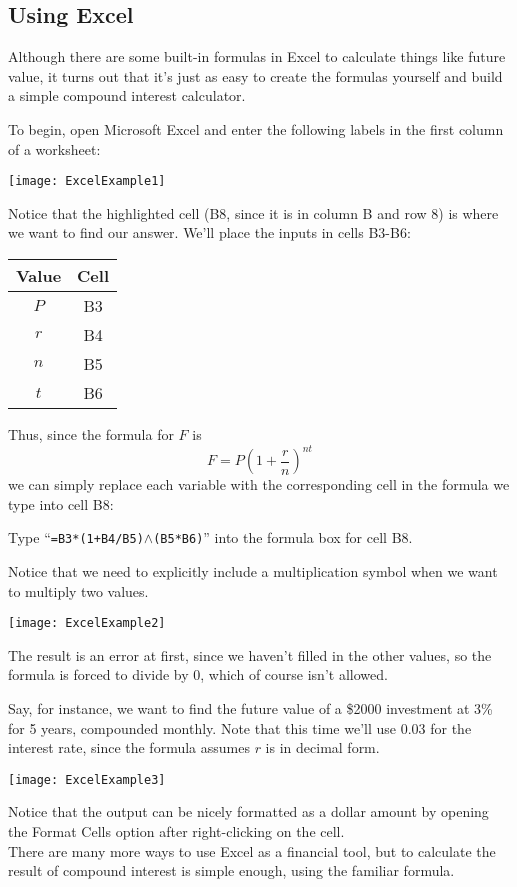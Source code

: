 \subsection{Using Excel}
Although there are some built-in formulas in Excel to calculate things like future value, it turns out that it's just as easy to create the formulas yourself and build a simple compound interest calculator.

To begin, open Microsoft Excel and enter the following labels in the first column of a worksheet:
\begin{center}
\texttt{[image: ExcelExample1]}
\end{center}

Notice that the highlighted cell (B8, since it is in column B and row 8) is where we want to find our answer.  We'll place the inputs in cells B3-B6:
\begin{center}
\begin{tabular}{c c}
\textbf{Value} & \textbf{Cell}\\
\hline
$P$ & B3\\
$r$ & B4\\
$n$ & B5\\
$t$ & B6
\end{tabular}
\end{center}

Thus, since the formula for $F$ is 
\[F = P\left(1+\dfrac{r}{n}\right)^{nt}\]
we can simply replace each variable with the corresponding cell in the formula we type into cell B8:
\begin{center}
Type ``\texttt{=B3*(1+B4/B5)}$\wedge$\texttt{(B5*B6)}'' into the formula box for cell B8.
\end{center}
Notice that we need to explicitly include a multiplication symbol when we want to multiply two values.
\begin{center}
\texttt{[image: ExcelExample2]}
\end{center}

The result is an error at first, since we haven't filled in the other values, so the formula is forced to divide by 0, which of course isn't allowed.
\vfill
\pagebreak

Say, for instance, we want to find the future value of a \$2000 investment at 3\% for 5 years, compounded monthly.  Note that this time we'll use 0.03 for the interest rate, since the formula assumes $r$ is in decimal form.
\begin{center}
\texttt{[image: ExcelExample3]}
\end{center}

Notice that the output can be nicely formatted as a dollar amount by opening the Format Cells option after right-clicking on the cell.\\

There are many more ways to use Excel as a financial tool, but to calculate the result of compound interest is simple enough, using the familiar formula.